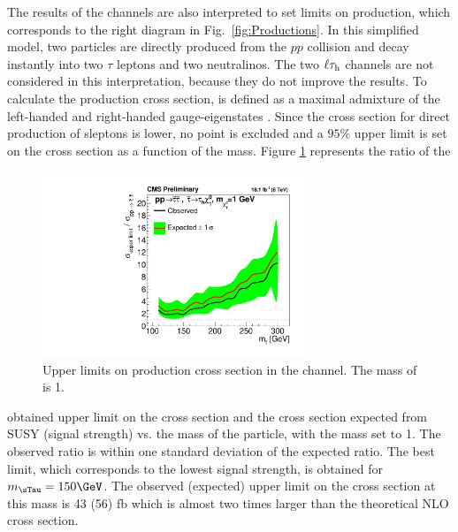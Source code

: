 The results of the \tauTau channels are also interpreted to set limits on \sTau\sTau production, 
which corresponds to the right diagram in Fig.~\ref{fig:Productions}. 
In this simplified model, two \sTau particles are directly produced from the $pp$ collision and decay instantly 
into two $\tau$ leptons and two neutralinos. 
The two $\ell\tau_{\rm h}$ channels are not considered in this interpretation, because they do not improve the results. 
To calculate the production cross section, \sTau is 
defined as a maximal admixture of the left-handed and right-handed \sTau gauge-eigenstates \cite{Fuks:2013lya}. 
Since the cross section for direct production of sleptons is lower, no point is excluded and a $95\%$ upper limit is set on 
the cross section  as a function of the \sTau mass. 
Figure \ref{fig:limit_stau_stau} represents the ratio of the 
\begin{linenomath}
\begin{figure}[!htb]
\centering
\includegraphics[width=0.7\textwidth,keepaspectratio=true]{StatisticsFig/ExclusionSTauSTauLsp1.pdf}
\caption{Upper limits on \sTau\sTau production cross section in the \tauTau channel. The mass of \PSGczDo is 1\GeV.}
\label{fig:limit_stau_stau}
\end{figure}
\end{linenomath}
obtained upper limit on the cross section and the cross section expected from SUSY (signal strength) vs. the mass of the \sTau particle, with the \PSGczDo mass set to 1\GeV.
The observed ratio is within one standard deviation of  the expected ratio.
The best limit, which corresponds to the lowest signal strength, is obtained for $m_{\sTau}=150\GeV$. The observed (expected) upper limit on the cross section at this mass is 43 (56) fb which is almost two  times larger than the theoretical NLO cross section.



